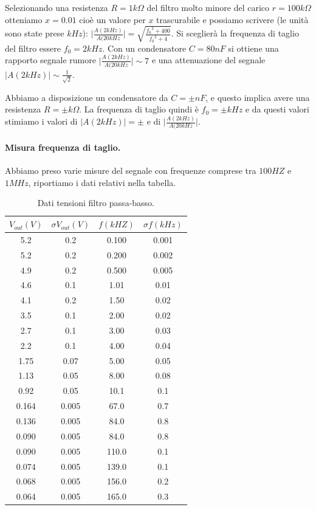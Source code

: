 \documentclass[10pt,a4paper]{article}
\begin{document}
Selezionando una resistenza $R = 1 k\Omega$ del filtro molto minore del carico $r = 100 k\Omega$ otteniamo $x = 0.01$ cioè un valore per $x$ trascurabile e possiamo scrivere (le unità sono state prese $kHz$): 
$\vert \frac{A(2 kHz)}{A(20 kHz} \vert = \sqrt{\frac{{f_0}^2  + 400}{{f_0}^2 + 4}}$. Si sceglierà la frequenza di taglio del filtro essere $f_0 = 2kHz$. Con un condensatore $C = 80 nF$ si ottiene una rapporto segnale rumore $\vert \frac{A(2 kHz)}{A(20 kHz} \vert \sim 7$ e una attenuazione del segnale $\vert A(2 kHz) \vert \sim \frac{1}{\sqrt{2}}$.

Abbiamo a disposizione un condensatore da $C = \pm nF$, e questo implica avere una resistenza $R = \pm k\Omega$.
La frequenza di taglio quindi è $f_0 = \pm kHz$ e da questi valori stimiamo i valori di $\vert A(2 kHz) \vert = \pm $ e di $\vert \frac{A(2 kHz)}{A(20 kHz} \vert$.

\paragraph{Misura frequenza di taglio.}
Abbiamo preso varie misure del segnale con frequenze comprese tra $100HZ$ e $1MHz$, riportiamo i dati relativi nella tabella.

\begin{table}[h]
\centering
\begin{tabular}{|c|c|c|c|}
\hline 
$V_{out} (V)$  &  $\sigma V_{out} (V)$ &  $f(kHZ)$ & $\sigma f(kHz)$ \\ 
\hline 
5.2 & 0.2 & 0.100 & 0.001 \\ 
\hline 
5.2 & 0.2 & 0.200 & 0.002 \\ 
\hline 
4.9 & 0.2 & 0.500 & 0.005 \\ 
\hline 
4.6 & 0.1 & 1.01 & 0.01 \\ 
\hline 
4.1 & 0.2 & 1.50 & 0.02 \\ 
\hline 
3.5 & 0.1 & 2.00 & 0.02 \\ 
\hline 
2.7 & 0.1 & 3.00 & 0.03 \\ 
\hline 
2.2 & 0.1 & 4.00 & 0.04 \\ 
\hline 
1.75 & 0.07 & 5.00 & 0.05 \\ 
\hline 
1.13 & 0.05 & 8.00 & 0.08 \\ 
\hline 
0.92 & 0.05 & 10.1 & 0.1 \\ 
\hline 
0.164 & 0.005 & 67.0 & 0.7 \\ 
\hline 
0.136 & 0.005 & 84.0 & 0.8 \\ 
\hline 
0.090 & 0.005 & 84.0 & 0.8 \\ 
\hline 
0.090 & 0.005 & 110.0 & 0.1 \\ 
\hline 
0.074 & 0.005 & 139.0 & 0.1 \\ 
\hline 
0.068 & 0.005 & 156.0 & 0.2 \\ 
\hline 
0.064 & 0.005 & 165.0 & 0.3 \\ 
\hline 
\end{tabular} 
\caption{Dati tensioni filtro passa-basso.}
\end{table}
\end{document}
